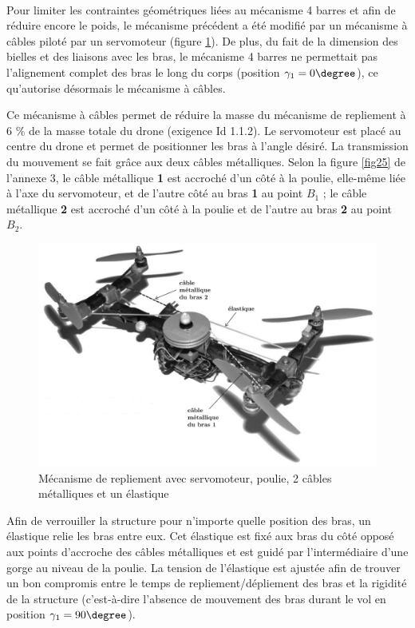 
~\

Pour limiter les contraintes géométriques liées au mécanisme 4 barres et afin de réduire encore le poids, le mécanisme précédent a été modifié par un mécanisme à câbles piloté par un servomoteur (figure \ref{fig11}). De plus, du fait de la dimension des bielles et des liaisons avec les bras, le mécanisme 4 barres ne permettait pas l'alignement complet des bras le long du corps (position $\gamma_1=0\degree$), ce qu'autorise désormais le mécanisme à câbles.

Ce mécanisme à câbles permet de réduire la masse du mécanisme de repliement à 6 \% de la masse totale du drone (exigence Id 1.1.2). Le servomoteur est placé au centre du drone et permet de positionner les bras à l'angle désiré. La transmission du mouvement se fait grâce aux deux câbles métalliques. Selon la figure \ref{fig25} de l'annexe 3, le câble métallique \textbf{1} est accroché d'un côté à la poulie, elle-même liée à l'axe du servomoteur, et de l'autre côté au bras \textbf{1} au point $B_1$ ; le câble métallique \textbf{2} est accroché d'un côté à la poulie et de l'autre au bras \textbf{2} au point $B_2$.

\newpage

\begin{figure}[ht!]
\begin{center}
 \includegraphics[width=0.65\linewidth]{img/fig11}
\end{center}
\caption{\label{fig11} Mécanisme de repliement avec servomoteur, poulie, 2 câbles métalliques et un élastique}
\end{figure}

Afin de verrouiller la structure pour n'importe quelle position des bras, un élastique relie les bras entre eux. Cet élastique est fixé aux bras du côté opposé aux points d'accroche des câbles métalliques et est guidé par l'intermédiaire d'une gorge au niveau de la poulie. La tension de l'élastique est ajustée afin de trouver un bon compromis entre le temps de repliement/dépliement des bras et la rigidité de la structure (c'est-­à-­dire l'absence de mouvement des bras durant le vol en position $\gamma_1=90\degree$).

